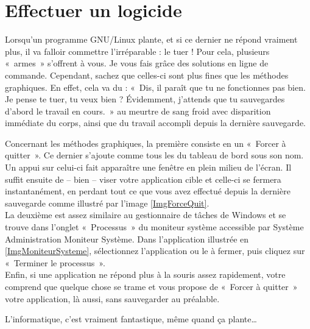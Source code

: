 \section{Effectuer un logicide}
\label{RefTuerProcessus}
Lorsqu'un programme GNU/Linux plante, et si ce dernier ne répond vraiment plus, il va falloir commettre l'irréparable : le tuer ! Pour cela, plusieurs «~armes~» s'offrent à vous. Je vous fais grâce des solutions en ligne de commande. Cependant, sachez que celles-ci sont plus fines que les méthodes graphiques. En effet, cela va du : «~Dis, il paraît que tu ne fonctionnes pas bien. Je pense te tuer, tu veux bien ? Évidemment, j'attends que tu sauvegardes d'abord le travail en cours.~» au meurtre de sang froid avec disparition immédiate du corps, ainsi que du travail accompli depuis la dernière sauvegarde.\par
\ForcerTuer
Concernant les méthodes graphiques, la première consiste en un  «~Forcer à quitter~». Ce dernier s'ajoute comme tous les  du tableau de bord sous son nom. Un appui sur celui-ci fait apparaître une fenêtre en plein milieu de l'écran. Il suffit ensuite de -- bien -- viser votre application cible et celle-ci se fermera instantanément, en perdant tout ce que vous avez effectué depuis la dernière sauvegarde comme illustré par l'image \ref{ImgForceQuit}.\\
La deuxième est assez similaire au gestionnaire de tâches de Windows et se trouve dans l'onglet «~Processus~» du moniteur système accessible par Système \FlecheDroite Administration \FlecheDroite Moniteur Système. Dans l'application illustrée en \ref{ImgMoniteurSysteme}, sélectionnez l'application ou le  à fermer, puis cliquez sur «~Terminer le processus~».\\
Enfin, si une application ne répond plus à la souris assez rapidement, votre  comprend que quelque chose se trame et vous propose de «~Forcer à quitter~» votre application, là aussi, sans sauvegarder au préalable.\par
L'informatique, c'est vraiment fantastique, même quand ça plante\ldots{}
